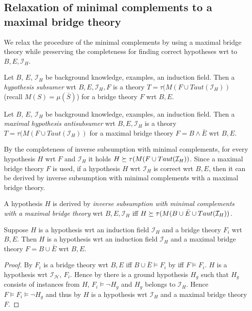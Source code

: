 \subsection{Relaxation of minimal complements to a maximal bridge theory}
We relax the procedure of the minimal complements by using a maximal bridge theory while preserving the completeness for finding correct hypotheses wrt to $B, E, \mathcal{I}_H$.

\begin{defn}
Let $B$, $E$, $\mathcal{I}_H$ be background knowledge, examples, an induction field. Then a \emph{hypothesis subsumer} wrt $B, E, \mathcal{I}_H, F$ is a theory
$T=\tau(M(F \cup Taut(\mathcal{I}_H))$ (recall $M(S)=\mu(\bar{S})$) for a bridge theory $F$ wrt $B, E$.
\end{defn}

\begin{defn}
Let $B$, $E$, $\mathcal{I}_H$ be background knowledge, examples, an induction field. Then a \emph{maximal hypothesis antisubsumer} wrt $B, E, \mathcal{I}_H$ is a theory
$T=\tau(M(F \cup Taut(\mathcal{I}_H))$ for a maximal bridge theory $F=B \land \bar{E}$ wrt $B, E$.
\end{defn}

By the completeness of inverse subsumption with minimal complements, for every hypothesis $H$ wrt $F$ and $\mathcal{I}_H$ it holds $H \succeq \tau(M(F \cup Taut(\mathcal{I}_H))$. Since a maximal bridge theory $F$ is used, if a hypothesis $H$ wrt $\mathcal{I}_H$ is correct wrt $B, E$, then it can be derived by inverse subsumption with minimal complements with a maximal bridge theory.

\begin{defn}
A hypothesis $H$ is derived by \emph{inverse subsumption with minimal complements with a maximal bridge theory} wrt $B, E, \mathcal{I}_H$ iff
$H \succeq \tau(M(B \cup \bar{E} \cup Taut(\mathcal{I}_H))$.
\end{defn}

\begin{lemma}\label{lemma_hypothesis_wrt_bridge_theory_correspondence}
Suppose $H$ is a hypothesis wrt an induction field $\mathcal{I}_H$ and a bridge theory $F_i$ wrt $B, E$. Then $H$ is a hypothesis wrt an induction field $\mathcal{I}_H$ and a maximal bridge theory $F=B \cup \bar{E}$ wrt $B, E$.
\end{lemma}
\begin{proof}
By  $F_i$ is a bridge theory wrt $B, E$ iff $B \cup \bar{E} \models F_i$ by  iff $F \models F_i$.
$H$ is a hypothesis wrt $\mathcal{I_H}$, $F_i$. Hence by  there is a ground hypothesis $H_g$ such that $H_g$ consists of instances from $H$,
$F_i \models \neg H_g$ and $H_g$ belongs to $\mathcal{I}_H$. Hence $F \models F_i \models \neg H_g$ and thus by  $H$ is a hypothesis wrt $\mathcal{I}_H$ and a maximal bridge theory $F$.
\end{proof}

